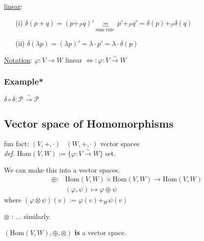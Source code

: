\documentclass[10pt, twoside]{amsart}
\begin{document}
\begin{multicols*}{2}
\underline{linear}: \begin{enumerate}
\item[(i)] $\delta(p+q) = (p+_{\mathcal{P}} q)' \underbrace{=}_{\text{sum rule }} p' +_{\mathcal{P}} q' = \delta(p) +_{\mathcal{P}} \delta(q) $
\item[(ii)] $\delta(\lambda p) = (\lambda p)' = \lambda \cdot p'= \lambda \cdot \delta(p)$
\end{enumerate}

\underline{Notation}: $\varphi : V \to W$ linear $\Longleftrightarrow : \varphi : V \xrightarrow{ \sim } W$


\subsubsection{Example*} $\delta \circ \delta : \mathcal{P} \xrightarrow{ \sim } \mathcal{P}$

\subsection{Vector space of Homomorphisms}

fun fact: $(V,+,\cdot)$ \, $(W,+,\cdot)$ vector spaces \\
\qquad \emph{def.} $\text{Hom}(V,W) := \lbrace \varphi : V \xrightarrow{ \sim } W \rbrace$  \qquad set.

We can make this into a vector spaces. 
\[
\begin{aligned}
\oplus  :  &  \text{Hom}(V,W) \times \text{Hom}(V,W) \to \text{Hom}(V,W) \\ 
& (\varphi, \psi) \mapsto \varphi \oplus \psi
\end{aligned}
\]
where $(\varphi \otimes \psi )(v) := \varphi(v) +_W \psi(v)$

$\otimes$ : $\dots$ similarly.  

$(\text{Hom}(V,W), \oplus, \otimes)$ \textbf{is} a vector space.


\end{multicols*}
\end{document}
